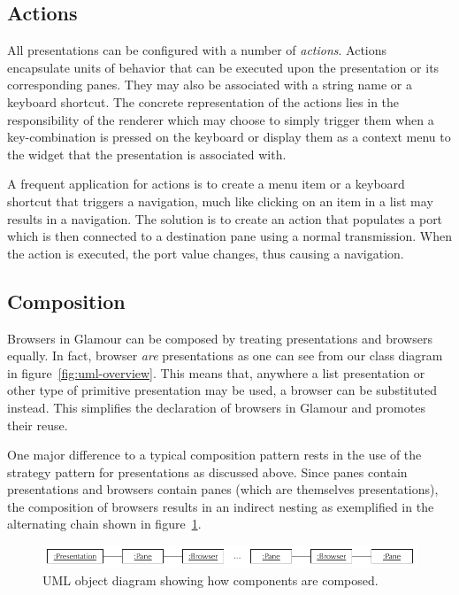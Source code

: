 \documentclass[a4paper,10pt,twoside]{book}
\begin{document}
\subsection{Actions}
\label{sec:impl/actions}

All presentations can be configured with a number of
\emph{actions}. Actions encapsulate units of behavior that can be
executed upon the presentation or its corresponding panes. They may
also be associated with a string name or a keyboard shortcut. The
concrete representation of the actions lies in the responsibility of
the renderer which may choose to simply trigger them when a
key-combination is pressed on the keyboard or display them as a
context menu to the widget that the presentation is associated with.

A frequent application for actions is to create a menu item or a
keyboard shortcut that triggers a navigation, much like clicking on an
item in a list may results in a navigation. The solution is to create
an action that populates a port which is then connected to a
destination pane using a normal transmission. When the action is
executed, the port value changes, thus causing a navigation.


\subsection{Composition}
\label{sec:impl/composition}

Browsers in Glamour can be composed by treating presentations and browsers equally. In fact, browser \emph{are} presentations as one can see from our class diagram in figure~\ref{fig:uml-overview}. This means that, anywhere a list presentation or other type of primitive presentation may be used, a browser can be substituted instead. This simplifies the declaration of browsers in Glamour and promotes their reuse.

One major difference to a typical composition pattern rests in the use of the strategy pattern for presentations as discussed above. Since panes contain presentations and browsers contain panes (which are themselves presentations), the composition of browsers results in an indirect nesting as exemplified in the alternating chain shown in figure~\ref{fig:uml-object-chain}.

\begin{figure}[htbp]
\centerline{\includegraphics[width=\linewidth]{uml_object_chain.pdf}}
\caption{UML object diagram showing how components are composed.}
\label{fig:uml-object-chain}
\end{figure}
\end{document}
